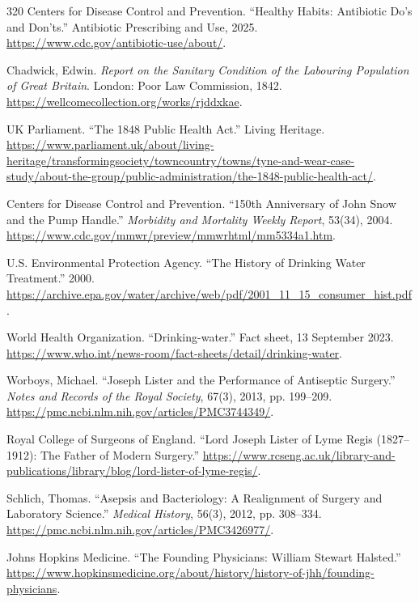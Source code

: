 \documentclass[12pt,oneside]{book}
\begin{document}
\begin{thebibliography}{320}
Centers for Disease Control and Prevention. ``Healthy Habits: Antibiotic
Do's and Don'ts.'' Antibiotic Prescribing and Use, 2025.
\url{https://www.cdc.gov/antibiotic-use/about/}.

Chadwick, Edwin. \emph{Report on the Sanitary Condition of the Labouring
Population of Great Britain}. London: Poor Law Commission, 1842.
\url{https://wellcomecollection.org/works/rjddxkae}.

UK Parliament. ``The 1848 Public Health Act.'' Living Heritage.
\url{https://www.parliament.uk/about/living-heritage/transformingsociety/towncountry/towns/tyne-and-wear-case-study/about-the-group/public-administration/the-1848-public-health-act/}.

Centers for Disease Control and Prevention. ``150th Anniversary of John Snow
and the Pump Handle.'' \emph{Morbidity and Mortality Weekly Report}, 53(34),
2004. \url{https://www.cdc.gov/mmwr/preview/mmwrhtml/mm5334a1.htm}.

U.S. Environmental Protection Agency. ``The History of Drinking Water
Treatment.'' 2000. \url{https://archive.epa.gov/water/archive/web/pdf/2001_11_15_consumer_hist.pdf}.

World Health Organization. ``Drinking-water.'' Fact sheet, 13 September 2023.
\url{https://www.who.int/news-room/fact-sheets/detail/drinking-water}.

Worboys, Michael. ``Joseph Lister and the Performance of Antiseptic
Surgery.'' \emph{Notes and Records of the Royal Society}, 67(3), 2013,
pp. 199--209. \url{https://pmc.ncbi.nlm.nih.gov/articles/PMC3744349/}.

Royal College of Surgeons of England. ``Lord Joseph Lister of Lyme Regis
(1827--1912): The Father of Modern Surgery.''
\url{https://www.rcseng.ac.uk/library-and-publications/library/blog/lord-lister-of-lyme-regis/}.

Schlich, Thomas. ``Asepsis and Bacteriology: A Realignment of Surgery and
Laboratory Science.'' \emph{Medical History}, 56(3), 2012, pp. 308--334.
\url{https://pmc.ncbi.nlm.nih.gov/articles/PMC3426977/}.

Johns Hopkins Medicine. ``The Founding Physicians: William Stewart Halsted.''
\url{https://www.hopkinsmedicine.org/about/history/history-of-jhh/founding-physicians}.


\end{thebibliography}
\end{document}

